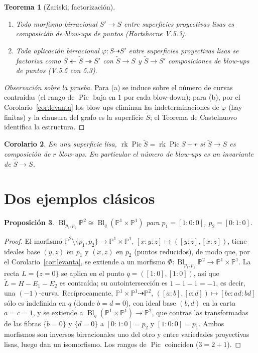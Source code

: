 \documentclass[11pt,a4paper,oneside]{book}
\newcommand{\Bl}{\operatorname{Bl}}
\newcommand{\Pic}{\operatorname{Pic}}
\newcommand{\PP}{\mathbb{P}}
\theoremstyle{plain}
\newtheorem{teorema}{Teorema}[chapter]
\newtheorem{proposicion}[teorema]{Proposición}
\newtheorem{corolario}[teorema]{Corolario}
\theoremstyle{definition}
\theoremstyle{remark}
\begin{document}
\begin{teorema}[Zariski; factorización]\label{teo:zariski}
\begin{enumerate}[label=(\alph*)]
\item Todo morfismo birracional $S'\to S$ entre superficies proyectivas lisas es composición de blow-ups de puntos (Hartshorne V.5.3).
\item Toda aplicación birracional $\varphi:S\dashrightarrow S'$ entre superficies proyectivas lisas se factoriza como $S\twoheadleftarrow\tilde S\twoheadrightarrow S'$ con $\tilde S\to S$ y $\tilde S\to S'$ composiciones de blow-ups de puntos (V.5.5 con 5.3).
\end{enumerate}
\end{teorema}

\begin{proof}[Observación sobre la prueba]
Para (a) se induce sobre el número de curvas contraídas (el rango de $\Pic$ baja en $1$ por cada blow-down); para (b), por el Corolario~\ref{cor:levanta} los blow-ups eliminan las indeterminaciones de $\varphi$ (hay finitas) y la clausura del grafo es la superficie $\tilde S$; el Teorema de Castelnuovo identifica la estructura.
\end{proof}

\begin{corolario}\label{cor:rango}
En una superficie lisa, $\operatorname{rk}\Pic\tilde S=\operatorname{rk}\Pic S+r$ si $\tilde S\to S$ es composición de $r$ blow-ups. En particular el número de blow-ups es un invariante de $\tilde S\to S$.
\end{corolario}

\section{Dos ejemplos clásicos}

\begin{proposicion}\label{prop:p1p1}
$\Bl_{p_1,p_2}\PP^2\cong\Bl_q(\PP^1\times\PP^1)$ para $p_1=[1:0:0]$, $p_2=[0:1:0]$.
\end{proposicion}

\begin{proof}
El morfismo $\PP^2\setminus\{p_1,p_2\}\to\PP^1\times\PP^1$, $[x:y:z]\mapsto([y:z],[x:z])$, tiene ideales base $(y,z)$ en $p_1$ y $(x,z)$ en $p_2$ (puntos reducidos), de modo que, por el Corolario~\ref{cor:levanta}, se extiende a un morfismo $\Phi:\Bl_{p_1,p_2}\PP^2\to\PP^1\times\PP^1$. La recta $L=\{z=0\}$ se aplica en el punto $q=([1:0],[1:0])$, así que $\tilde L=H-E_1-E_2$ es contraída; su autointersección es $1-1-1=-1$, es decir, una $(-1)$-curva. Recíprocamente, $\PP^1\times\PP^1\dashrightarrow\PP^2$, $([a:b],[c:d])\mapsto[bc:ad:bd]$ sólo es indefinida en $q$ (donde $b=d=0$), con ideal base $(b,d)$ en la carta $a=c=1$, y se extiende a $\Bl_q(\PP^1\times\PP^1)\to\PP^2$, que contrae las transformadas de las fibras $\{b=0\}$ y $\{d=0\}$ a $[0:1:0]=p_2$ y $[1:0:0]=p_1$. Ambos morfismos son inversos birracionales uno del otro y entre variedades proyectivas lisas, luego dan un isomorfismo. Los rangos de $\Pic$ coinciden ($3=2+1$).
\end{proof}
\end{document}

